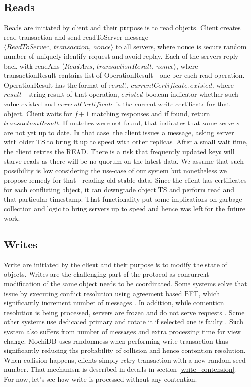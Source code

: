 \documentclass[letterpaper,twocolumn,10pt]{article}
\begin{document}
\subsection{Reads}
Reads are initiated by client and their purpose is to read objects. Client creates read transaction and send readToServer message $\langle ReadToServer,\ transaction,\ nonce \rangle$ to all servers, where nonce is secure random number of uniquely identify request and avoid replay. Each of the servers reply back with readAns $\langle ReadAns,\ transactionResult,\ nonce \rangle$, where transactionResult contains list of OperationResult - one per each read operation. OperationResult has the format of ${result,\ currentCertificate, existed}$, where $result$ - string result of that operation, $existed$ boolean indicator whether such value existed and $currentCertificate$ is the current write certificate for that object.
Client waits for $f+1$ matching responses and if found, return $transactionResult$. If matches were not found, that indicates that some servers are not yet up to date. In that case, the client issues a message, asking server with older TS to bring it up to speed with other replicas. After a small wait time, the client retries the READ.
There is a risk that frequently updated keys will starve reads as there will be no quorum on the latest data. We assume that such possibility is low considering the use-case of our system but nonetheless we propose remedy for that - reading old stable data. Since the client has certificates for each conflicting object, it can downgrade object TS and perform read and that particular timestamp. That functionality put some implications on garbage collection and logic to bring servers up to speed and hence was left for the future work.

\subsection{Writes} \label{Protocol_Writes}
Write are initiated by the client and their purpose is to modify the state of objects. Writes are the challenging part of the protocol as concurrent modification of the same object needs to be coordinated. Some systems solve that issue by executing conflict resolution using agreement based BFT, which significantly increment number of messages \cite{HQ_replication}. In addition, while contention resolution is being processed, servers are frozen and do not serve requests \cite{HQ_replication}. Some other systems use dedicated primary and rotate it if selected one is faulty \cite{Practical_BFT}. Such system also suffers from number of messages and extra processing time for view change.
MochiDB uses randomness when performing write transaction thus significantly reducing the probability of collision and hence contention resolution. When collision happens, clients simply retry transaction with a new random seed number. That mechanism is described in details in section \ref{write_contension}. For now, let's see how write is processed without any contention.
\end{document}
